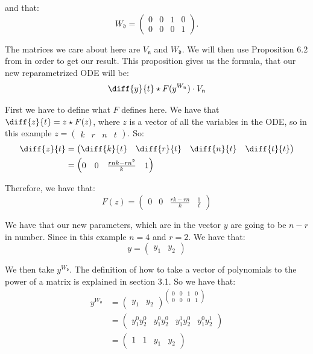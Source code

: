 \documentclass[oneside, a4paper, onecolumn, 11pt]{article}
\begin{document}
and that:
\[
    W_{\mathfrak{d}} = \begin{pmatrix}
        0 & 0 & 1 & 0 \\
        0 & 0 & 0 & 1
    \end{pmatrix}.
\]

The matrices we care about here are \(V_{\mathfrak{n}}\) and \(W_{\mathfrak{d}}\). We will then use Proposition 6.2 from \cite{Hubert2013} in order to get our result. This proposition gives us the formula, that our new reparametrized ODE will be:
\[
    \diff{y}{t} \star F(y^{W_{\mathfrak{n}}}) \cdot V_{\mathfrak{n}}
\]

First we have to define what \(F\) defines here. We have that \(\diff{z}{t} = z\star F(z)\), where \(z\) is a vector of all the variables in the ODE, so in this example \(z = \begin{pmatrix} k & r & n & t \end{pmatrix}\). So:
\begin{align*}
    \diff{z}{t}
     & = \begin{pmatrix}
             \diff{k}{t} & \diff{r}{t} & \diff{n}{t} & \diff{t}{t}
         \end{pmatrix} \\
     & = \begin{pmatrix}
             0 & 0 & \frac{rnk - rn^2}{k} & 1 \\
         \end{pmatrix}
\end{align*}

Therefore, we have that:
\[
    F(z) = \begin{pmatrix}
        0 & 0 & \frac{rk - rn}{k} & \frac{1}{t}
    \end{pmatrix}
\]

We have that our new parameters, which are in the vector \(y\) are going to be \(n - r\) in number. Since in this example \(n = 4\) and \(r = 2\). We have that:
\[
    y = \begin{pmatrix}
        y_1 & y_2
    \end{pmatrix}
\]

We then take \(y^{W_{\mathfrak{d}}}\). The definition of how to take a vector of polynomials to the power of a matrix is explained in section 3.1. So we have that:
\begin{align*}
    y^{W_{\mathfrak{d}}}
     & = \begin{pmatrix}
             y_1 & y_2
         \end{pmatrix}^{
    \begin{pmatrix}
        0 & 0 & 1 & 0 \\
        0 & 0 & 0 & 1
    \end{pmatrix}}                                             \\
     & = \begin{pmatrix}
             y_1^0 y_2^0 & y_1^0 y_2^0 & y_1^1 y_2^0 & y_1^0 y_2^1
         \end{pmatrix} \\
     & = \begin{pmatrix}
             1 & 1 & y_1 & y_2
         \end{pmatrix}
\end{align*}
\end{document}
